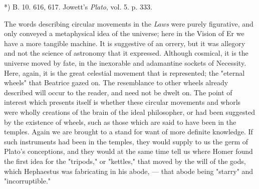 \documentclass[a4paper, 11pt, oneside, polutonikogreek, english]{article}
\begin{document}
*) B. 10. 616, 617. Jowett's \emph{Plato}, vol. 5. p. 333.

The words describing circular movements in the \emph{Laws} were purely figurative, and only conveyed a metaphysical idea of the universe; here in the Vision of Er we have a more tangible machine. It is suggestive of an orrery, but it was allegory and not the science of astronomy that it expressed. Although cosmical, it is the universe moved by fate, in the inexorable and adamantine sockets of Necessity. Here, again, it is the great celestial movement that is represented; the "eternal wheels" that Beatrice gazed on. The resemblance to other wheels already described will occur to the reader, and need not be dwelt on. The point of interest which presents itself is whether these circular movements and whorls were wholly creations of the brain of the ideal philosopher, or had been suggested by the existence of wheels, such as those which are said to have been in the temples. Again we are brought to a stand for want of more definite knowledge. If such instruments had been in the temples, they would supply to us the germ of Plato's conceptions, and they would at the same time tell us where Homer found the first idea for the "tripods," or "kettles," that moved by the will of the gods, which Hephaestus was fabricating in his abode, --- that abode being "starry" and "incorruptible."
\end{document}
